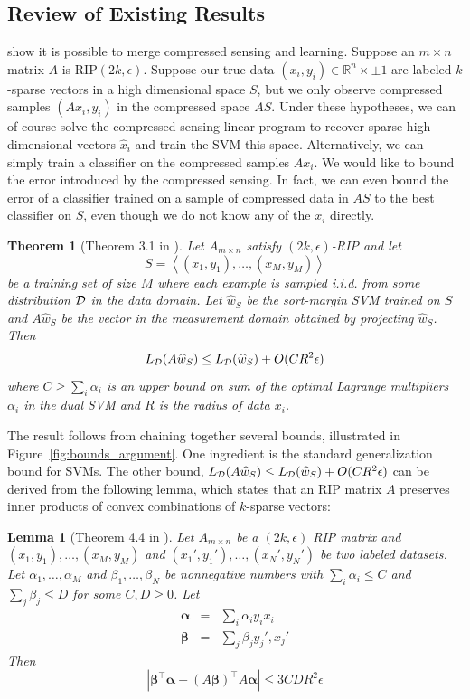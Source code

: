 \documentclass[english]{article}
\theoremstyle{plain}
\newtheorem{theorem}{Theorem}
\newtheorem{lemma}{Lemma}
\begin{document}
\subsection{Review of Existing Results}
\citet{Calderbank09} show it is possible to merge compressed sensing and learning.
Suppose an $m \times n$ matrix $A$ is $\mbox{RIP}(2k,\epsilon)$.
Suppose our true data $(x_i, y_i) \in \mathbb{R}^n \times {\pm 1}$ are labeled $k$-sparse vectors in a high dimensional space $S$, but we only observe compressed samples $(Ax_i,y_i)$ in the compressed space $AS$.
Under these hypotheses, we can of course solve the compressed sensing linear program to recover sparse high-dimensional vectors $\widehat{x}_i$ and train the SVM this space.
Alternatively, we can simply train a classifier on the compressed samples $Ax_i$.
We would like to bound the error introduced by the compressed sensing.
In fact, we can even bound the error of a classifier trained on a sample of compressed data in $AS$ to the best classifier on $S$, even though we do not know any of the $x_i$ directly.
\begin{theorem}[Theorem 3.1 in \citet{Calderbank09}]
\label{theorem:alog} Let $A_{m\times n}$ satisfy $(2k,\epsilon)$-RIP
and let
\[
S=\left\langle (x_{1},y_{1}),\ldots,(x_{M},y_{M})\right\rangle 
\]
be a training set of size $M$ where each example is sampled i.i.d.
from some distribution ${\cal D}$ in the data domain. Let $\widehat{w}_{S}$
be the sort-margin SVM trained on $S$ and $A\widehat{w}_{S}$ be
the vector in the measurement domain obtained by projecting $\widehat{w}_{S}$.
Then
\[
L_{{\cal D}}(A\widehat{w}_{S})\leq L_{{\cal D}}(\widehat{w}_{S})+O(CR^{2}\epsilon)
\]
where $C\geq\sum_{i}\alpha_{i}$ is an upper bound on sum of the optimal
Lagrange multipliers $\alpha_{i}$ in the dual SVM and $R$ is the
radius of data $x_{i}$.
\end{theorem}

The result follows from chaining together several bounds, illustrated in Figure~\ref{fig:bounds_argument}. One ingredient is the standard generalization bound for SVMs.
The other bound, $L_{\cal D}(A\widehat{w}_S) \leq L_{\cal D}(\widehat{w}_S) + O(CR^2\epsilon)$ can be derived from the following lemma, which states that an RIP matrix $A$ preserves inner products of convex combinations of $k$-sparse vectors:

\begin{lemma}[Theorem 4.4 in \citet{Calderbank2009}]
\label{lemma:their-theorem-44}Let $A_{m\times n}$ be a $(2k,\epsilon)$
RIP matrix and $(x_1,y_1), \ldots, (x_M,y_M)$ and $(x_1',y_1'), \ldots, (x_N',y_N')$ be two labeled datasets. Let $\alpha_1, \ldots, \alpha_M$ and $\beta_1, \ldots, \beta_N$ be nonnegative numbers with $\sum_i \alpha_i \leq C$ and $\sum_j \beta_j \leq D$ for some $C, D \geq 0$. Let
\begin{eqnarray*}
\bm{\alpha} & = & \sum_{i}\alpha_iy_ix_i \\
\bm{\beta} & = & \sum_{j}\beta_j y_j',x_j'
\end{eqnarray*}
Then
\[
\left|\bm{\beta}^{\top}\bm{\alpha}-\left(A\bm{\beta}\right)^{\top}A\bm{\alpha}\right|\leq3CDR^{2}\epsilon
\]
\end{lemma}
\end{document}
